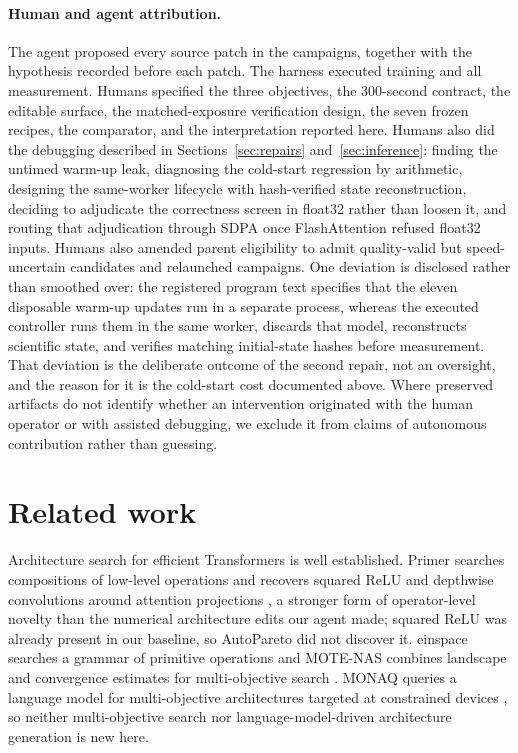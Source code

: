 \documentclass{article}
\begin{document}
\paragraph{Human and agent attribution.} The agent proposed every source patch in the campaigns, together with the hypothesis recorded before each patch. The harness executed training and all measurement. Humans specified the three objectives, the 300-second contract, the editable surface, the matched-exposure verification design, the seven frozen recipes, the comparator, and the interpretation reported here. Humans also did the debugging described in Sections~\ref{sec:repairs} and~\ref{sec:inference}: finding the untimed warm-up leak, diagnosing the cold-start regression by arithmetic, designing the same-worker lifecycle with hash-verified state reconstruction, deciding to adjudicate the correctness screen in float32 rather than loosen it, and routing that adjudication through SDPA once FlashAttention refused float32 inputs. Humans also amended parent eligibility to admit quality-valid but speed-uncertain candidates and relaunched campaigns. One deviation is disclosed rather than smoothed over: the registered program text specifies that the eleven disposable warm-up updates run in a separate process, whereas the executed controller runs them in the same worker, discards that model, reconstructs scientific state, and verifies matching initial-state hashes before measurement. That deviation is the deliberate outcome of the second repair, not an oversight, and the reason for it is the cold-start cost documented above. Where preserved artifacts do not identify whether an intervention originated with the human operator or with assisted debugging, we exclude it from claims of autonomous contribution rather than guessing.

\section{Related work}
Architecture search for efficient Transformers is well established. Primer searches compositions of low-level operations and recovers squared ReLU and depthwise convolutions around attention projections \citep{primer}, a stronger form of operator-level novelty than the numerical architecture edits our agent made; squared ReLU was already present in our baseline, so AutoPareto did not discover it. einspace searches a grammar of primitive operations \citep{einspace} and MOTE-NAS combines landscape and convergence estimates for multi-objective search \citep{mote}. MONAQ queries a language model for multi-objective architectures targeted at constrained devices \citep{monaq}, so neither multi-objective search nor language-model-driven architecture generation is new here.
\end{document}
